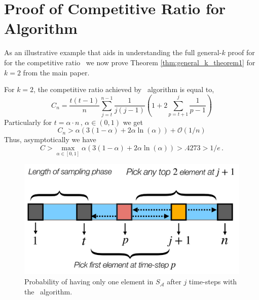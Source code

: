 \appendix
\onecolumn
\section{Proof of Competitive Ratio for \algoname Algorithm}
\label{appendix:virtual_plus_proof_k_2}

As an illustrative example that aids in understanding the full general-$k$ proof for for the competitive ratio \algoname\ we now prove Theorem \ref{thm:general_k_theorem1} for $k=2$ from the main paper. 

\begin{theorem}  For $k=2$, the competitive ratio achieved by \algoname\ algorithm is equal to, 
\begin{equation}
    C_n = \frac{t(t-1)}{n} \sum_{j=t}^{n-1}\frac{1}{j(j-1)} \left(1 + 2 \sum_{ p=t+1}^j \frac{1}{p-1}\right)
\end{equation}
Particularly for $t= \alpha \cdot n\,,\, \alpha \in (0,1)$ we get 
\begin{equation} \label{eq:lower_bound_alpha1}
    C_n > \alpha ( 3(1-\alpha) + 2 \alpha \ln(\alpha)) + \mathcal{O}(1/n)
\end{equation}
Thus, asymptotically  we have
\begin{equation}
    C >  \max_{\alpha \in [0,1]} \alpha ( 3(1-\alpha) + 2 \alpha \ln(\alpha)) > .4273 > 1/e \, .
\end{equation}
\end{theorem}

\begin{figure}[ht]
    \centering
    \includegraphics[width=1.0\linewidth]{Figures/virtual_plus_k_2.pdf}
    \caption{Probability of having only one element in $S_{\mathcal{A}}$ after $j$ time-steps with the \algoname\ algorithm.}
    \label{fig:k_2}
    \vspace{-15pt}
\end{figure}


